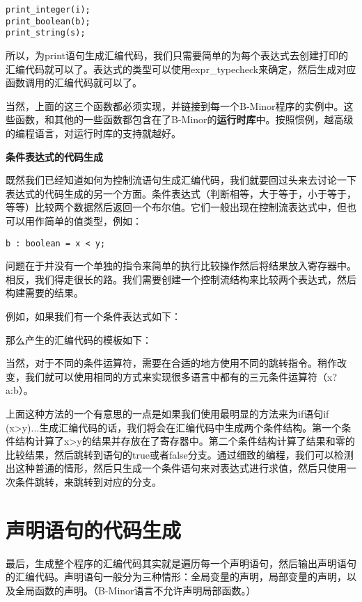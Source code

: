 \documentclass[cn,11pt,chinese]{elegantbook}
\begin{document}
\begin{verbatim}
print_integer(i);
print_boolean(b);
print_string(s);
\end{verbatim}

所以，为print语句生成汇编代码，我们只需要简单的为每个表达式去创建打印的汇编代码就可以了。表达式的类型可以使用expr\_typecheck来确定，然后生成对应函数调用的汇编代码就可以了。

当然，上面的这三个函数都必须实现，并链接到每一个B-Minor程序的实例中。这些函数，和其他的一些函数都包含在了B-Minor的\textbf{运行时库}中。按照惯例，越高级的编程语言，对运行时库的支持就越好。

\textbf{条件表达式的代码生成}

既然我们已经知道如何为控制流语句生成汇编代码，我们就要回过头来去讨论一下表达式的代码生成的另一个方面。条件表达式（判断相等，大于等于，小于等于，等等）比较两个数据然后返回一个布尔值。它们一般出现在控制流表达式中，但也可以用作简单的值类型，例如：

\begin{verbatim}
b : boolean = x < y;
\end{verbatim}

问题在于并没有一个单独的指令来简单的执行比较操作然后将结果放入寄存器中。相反，我们得走很长的路。我们需要创建一个控制流结构来比较两个表达式，然后构建需要的结果。

例如，如果我们有一个条件表达式如下：

那么产生的汇编代码的模板如下：

当然，对于不同的条件运算符，需要在合适的地方使用不同的跳转指令。稍作改变，我们就可以使用相同的方式来实现很多语言中都有的三元条件运算符（x?a:b）。

上面这种方法的一个有意思的一点是如果我们使用最明显的方法来为if语句if (x>y){...}生成汇编代码的话，我们将会在汇编代码中生成两个条件结构。第一个条件结构计算了x>y的结果并存放在了寄存器中。第二个条件结构计算了结果和零的比较结果，然后跳转到语句的true或者false分支。通过细致的编程，我们可以检测出这种普通的情形，然后只生成一个条件语句来对表达式进行求值，然后只使用一次条件跳转，来跳转到对应的分支。

\section{声明语句的代码生成}

最后，生成整个程序的汇编代码其实就是遍历每一个声明语句，然后输出声明语句的汇编代码。声明语句一般分为三种情形：全局变量的声明，局部变量的声明，以及全局函数的声明。（B-Minor语言不允许声明局部函数。）
\end{document}
